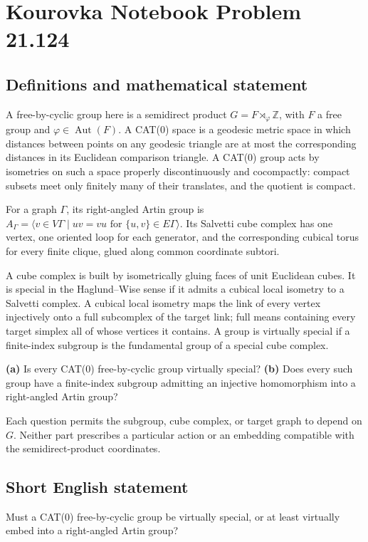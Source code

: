\documentclass[11pt,a4paper]{article}
\begin{document}
\section*{Kourovka Notebook Problem 21.124}\label{statement}

\subsection{Definitions and mathematical statement}
A free-by-cyclic group here is a semidirect product $G=F\rtimes_\varphi\mathbb Z$, with $F$ a free group and $\varphi\in\operatorname{Aut}(F)$. A CAT(0) space is a geodesic metric space in which distances between points on any geodesic triangle are at most the corresponding distances in its Euclidean comparison triangle. A CAT(0) group acts by isometries on such a space properly discontinuously and cocompactly: compact subsets meet only finitely many of their translates, and the quotient is compact.

For a graph $\Gamma$, its right-angled Artin group is $A_\Gamma=\langle v\in V\Gamma\mid uv=vu\text{ for }\{u,v\}\in E\Gamma\rangle$. Its Salvetti cube complex has one vertex, one oriented loop for each generator, and the corresponding cubical torus for every finite clique, glued along common coordinate subtori.

A cube complex is built by isometrically gluing faces of unit Euclidean cubes. It is special in the Haglund--Wise sense if it admits a cubical local isometry to a Salvetti complex. A cubical local isometry maps the link of every vertex injectively onto a full subcomplex of the target link; full means containing every target simplex all of whose vertices it contains. A group is virtually special if a finite-index subgroup is the fundamental group of a special cube complex.

\textbf{(a)} Is every CAT(0) free-by-cyclic group virtually special?
\textbf{(b)} Does every such group have a finite-index subgroup admitting an injective homomorphism into a right-angled Artin group?

Each question permits the subgroup, cube complex, or target graph to depend on $G$. Neither part prescribes a particular action or an embedding compatible with the semidirect-product coordinates.
\subsection{Short English statement}
Must a CAT(0) free-by-cyclic group be virtually special, or at least virtually embed into a right-angled Artin group?
\end{document}
